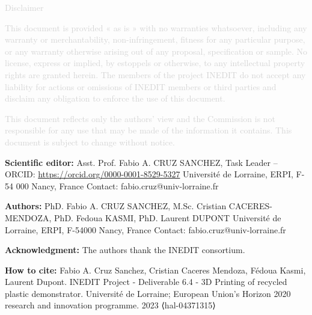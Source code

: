 \vfill

\begin{center}
\textcolor{lightgray}{Disclaimer}

\textcolor{lightgray}{
\small
This document is provided « as is » with no warranties whatsoever, including any warranty or merchantability, non-infringement, fitness for any particular purpose, or any warranty otherwise arising out of any proposal, specification or sample.  No license, express or implied, by estoppels or otherwise, to any intellectual property rights are granted herein. The members of the project INEDIT do not accept any liability for actions or omissions of INEDIT members or third parties and disclaim any obligation to enforce the use of this document. }

\textcolor{lightgray}{
This document reflects only the authors' view and the Commission is not responsible for any use that may be made of the information it contains.  This document is subject to change without notice. 
}
\end{center}
\normalsize


\newpage

\vfill



\textbf{Scientific editor:} \newline
Asst. Prof. Fabio A. CRUZ SANCHEZ, Task Leader – ORCID: \href{https://orcid.org/0000-0001-8529-5327}{https://orcid.org/0000-0001-8529-5327} \newline
Université de Lorraine, ERPI, F-54 000 Nancy, France \newline
Contact: fabio.cruz@univ-lorraine.fr 

\vspace{2cm}

\textbf{Authors:} \newline
PhD. Fabio A. CRUZ SANCHEZ, M.Sc. Cristian CACERES-MENDOZA, PhD. Fedoua KASMI, PhD. Laurent DUPONT \newline
Université de Lorraine, ERPI, F-54000 Nancy, France \newline
Contact: fabio.cruz@univ-lorraine.fr 

\vspace{2cm}

\textbf{Acknowledgment:}\newline
The authors thank the INEDIT consortium.

\vspace{2cm}

\textbf{How to cite:} \newline
Fabio A. Cruz Sanchez, Cristian Caceres Mendoza, Fédoua Kasmi, Laurent Dupont. 
INEDIT Project - Deliverable 6.4 - 3D Printing of recycled plastic demonstrator. 
Université de Lorraine; European Union’s Horizon 2020 research and innovation programme. 2023 ⟨hal-04371315⟩


\vfill
\newpage
